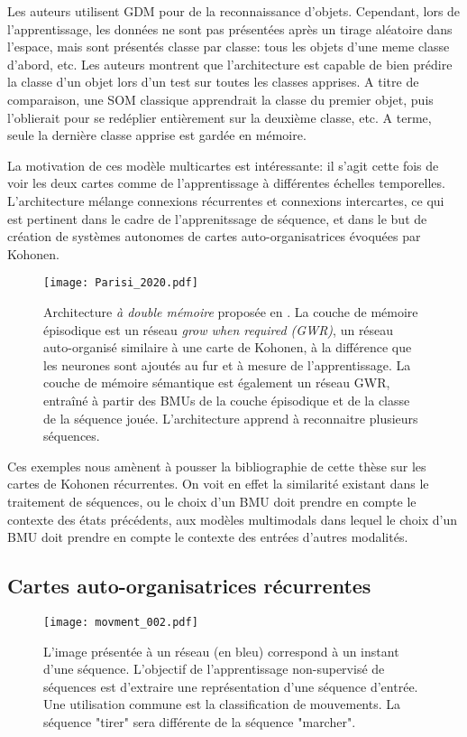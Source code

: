 \documentclass[../main]{subfiles}
\begin{document}
Les auteurs utilisent GDM pour de la reconnaissance d'objets. Cependant, lors de l'apprentissage, les données ne sont pas présentées après un tirage aléatoire dans l'espace, mais sont présentés classe par classe: tous les objets d'une meme classe d'abord, etc. Les auteurs montrent que l'architecture est capable de bien prédire la classe d'un objet lors d'un test sur toutes les classes apprises. A titre de comparaison, une SOM classique apprendrait la classe du premier objet, puis l'oblierait pour se redéplier entièrement sur la deuxième classe, etc. A terme, seule la dernière classe apprise est gardée en mémoire.


La motivation de ces modèle multicartes est intéressante: il s'agit cette fois de voir les deux cartes comme de l'apprentissage à différentes échelles temporelles. L'architecture mélange connexions récurrentes et connexions intercartes, ce qui est pertinent dans le cadre de l'apprenitssage de séquence, et dans le but de création de systèmes autonomes de cartes auto-organisatrices évoquées par Kohonen.


\begin{figure}
    \centering
    \texttt{[image: Parisi\_2020.pdf]}
    \caption{Architecture \emph{à double mémoire} proposée en \cite{parisiLL}. La couche de mémoire épisodique est un réseau \emph{grow when required (GWR)}, un réseau auto-organisé similaire à une carte de Kohonen, à la différence que les neurones sont ajoutés au fur et à mesure de l'apprentissage. La couche de mémoire sémantique est également un réseau GWR, entraîné à partir des BMUs de la couche épisodique et de la classe de la séquence jouée. L'architecture apprend à reconnaitre plusieurs séquences.\label{fig:gdm_parisi}}
\end{figure}

Ces exemples nous amènent à pousser la bibliographie de cette thèse sur les cartes de Kohonen récurrentes. On voit en effet la similarité existant dans le traitement de séquences, ou le choix d'un BMU doit prendre en compte le contexte des états précédents, aux modèles multimodals dans lequel le choix d'un BMU doit prendre en compte le contexte des entrées d'autres modalités. 


\subsection{Cartes auto-organisatrices récurrentes}

\begin{figure}
   \centering\texttt{[image: movment\_002.pdf]}
   \caption{L'image présentée à un réseau (en bleu) correspond à un instant d'une séquence. L'objectif de l'apprentissage non-supervisé de séquences est d'extraire une représentation d'une séquence d'entrée. Une utilisation commune est la classification de mouvements. La séquence "tirer" sera différente de la séquence "marcher".\label{fig:mouvement}}
\end{figure}
\end{document}
